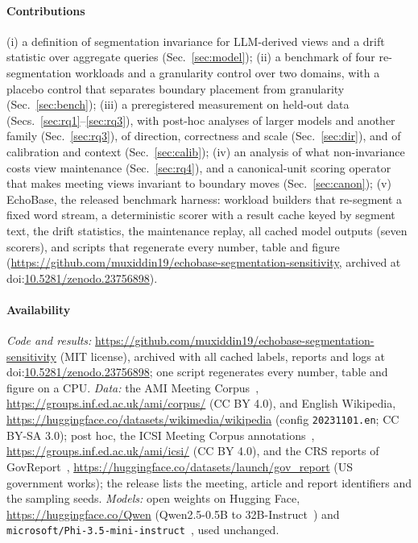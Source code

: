 \documentclass[conference]{IEEEtran}
\newcommand{\sys}{EchoBase}
\newcommand{\artifacturl}{\url{https://github.com/muxiddin19/echobase-segmentation-sensitivity}}
\newcommand{\artifactdoi}{doi:\href{https://doi.org/10.5281/zenodo.23756898}{10.5281/zenodo.23756898}}
\begin{document}
\paragraph*{Contributions}
(i) a definition of segmentation invariance for LLM-derived views and a drift statistic over aggregate queries
(Sec.~\ref{sec:model}); (ii) a benchmark of four re-segmentation workloads and a granularity control over two domains, with a placebo control
that separates boundary placement from granularity (Sec.~\ref{sec:bench}); (iii) a preregistered measurement on
held-out data (Secs.~\ref{sec:rq1}--\ref{sec:rq3}), with post-hoc analyses of larger models and another family
(Sec.~\ref{sec:rq3}), of direction, correctness and scale (Sec.~\ref{sec:dir}), and of calibration and context
(Sec.~\ref{sec:calib}); (iv) an analysis of what non-invariance costs view maintenance
(Sec.~\ref{sec:rq4}), and a canonical-unit scoring operator that makes meeting views invariant to boundary moves
(Sec.~\ref{sec:canon}); (v) \sys, the released benchmark harness: workload builders that re-segment a fixed word
stream, a deterministic scorer with a result cache keyed by segment text, the drift statistics, the maintenance
replay, all cached model outputs (seven scorers), and scripts that regenerate every number, table and figure
(\artifacturl, archived at \artifactdoi).

\paragraph*{Availability} \emph{Code and results:} \artifacturl{} (MIT license), archived with all cached labels,
reports and logs at \artifactdoi; one script regenerates every number, table and figure on a CPU.
\emph{Data:} the AMI Meeting Corpus~\cite{ami}, \url{https://groups.inf.ed.ac.uk/ami/corpus/} (CC BY 4.0), and
English Wikipedia, \url{https://huggingface.co/datasets/wikimedia/wikipedia} (config \texttt{20231101.en}; CC BY-SA
3.0); post hoc, the ICSI Meeting Corpus annotations~\cite{icsi,mrda}, \url{https://groups.inf.ed.ac.uk/ami/icsi/}
(CC BY 4.0), and the CRS reports of GovReport~\cite{govreport}, \url{https://huggingface.co/datasets/launch/gov_report}
(US government works); the release lists the meeting, article and report identifiers and the sampling seeds. \emph{Models:} open weights on
Hugging Face, \url{https://huggingface.co/Qwen} (Qwen2.5-0.5B to 32B-Instruct~\cite{qwen25}) and
\texttt{microsoft/Phi-3.5-mini-instruct}~\cite{phi3}, used unchanged.

\end{document}
